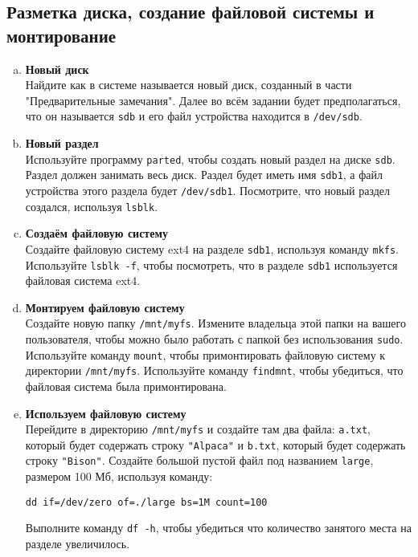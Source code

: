 \documentclass{article}
\begin{document}
\subsection{Разметка диска, создание файловой системы и монтирование}
\begin{enumerate}[a.]
\item \textbf{Новый диск}\\
Найдите как в системе называется новый диск, созданный в части "Предварительные замечания". Далее во всём задании будет предполагаться, что он называется \texttt{sdb} и его файл устройства находится в \texttt{/dev/sdb}.

\item \textbf{Новый раздел}\\
Используйте программу \texttt{parted}, чтобы создать новый раздел на диске \texttt{sdb}. Раздел должен занимать весь диск. Раздел будет иметь имя \texttt{sdb1}, а файл устройства этого раздела будет \texttt{/dev/sdb1}. Посмотрите, что новый раздел создался, используя \texttt{lsblk}.

\item \textbf{Создаём файловую систему}\\
Создайте файловую систему ext4 на разделе \texttt{sdb1}, используя команду \texttt{mkfs}. Используйте \texttt{lsblk -f}, чтобы посмотреть, что в разделе \texttt{sdb1} используется файловая система ext4.

\item \textbf{Монтируем файловую систему}\\
Создайте новую папку \texttt{/mnt/myfs}. Измените владельца этой папки на вашего пользователя, чтобы можно было работать с папкой без использования \texttt{sudo}. Используйте команду \texttt{mount}, чтобы примонтировать файловую систему к директории \texttt{/mnt/myfs}. Используйте команду \texttt{findmnt}, чтобы убедиться, что файловая система была примонтирована.

\item \textbf{Используем файловую систему}\\
Перейдите в директорию \texttt{/mnt/myfs} и создайте там два файла: \texttt{a.txt}, который будет содержать строку \texttt{"Alpaca"} и \texttt{b.txt}, который будет содержать строку \texttt{"Bison"}. Создайте большой пустой файл под названием \texttt{large}, размером 100 Мб, используя команду:
\begin{lstlisting}
dd if=/dev/zero of=./large bs=1M count=100
\end{lstlisting}
Выполните команду \texttt{df -h}, чтобы убедиться что количество занятого места на разделе увеличилось.


\end{enumerate}
\end{document}
